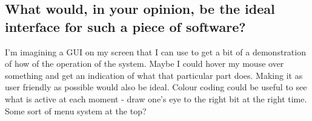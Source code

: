     \subsection{What would, in your opinion, be the ideal interface for such a piece of software?}
        I'm imagining a GUI on my screen that I can use to get a bit of a demonstration of how of the operation of the system. Maybe I could hover my mouse over something and get an indication of what that particular part does. Making it as user friendly as possible would also be ideal. Colour coding could be useful to see what is active at each moment - draw one's eye to the right bit at the right time. Some sort of menu system at the top?